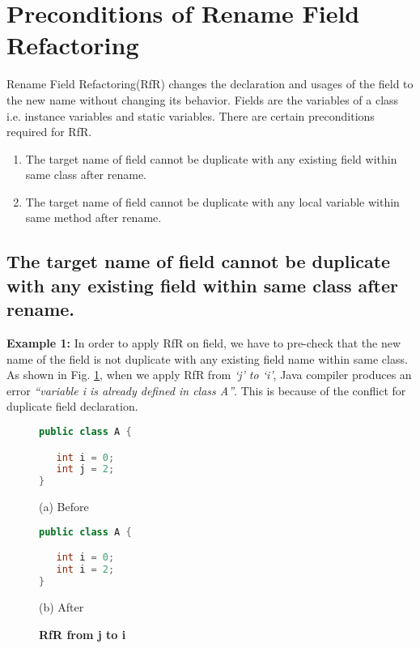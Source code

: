\section{\textbf{Preconditions of Rename Field Refactoring}}
Rename Field Refactoring(RfR) changes the declaration and usages of the field to the new name without changing its behavior.
Fields are the variables of a class i.e. instance variables and static variables.
There are certain preconditions required for RfR.

\begin{enumerate}
	\item The target name of field cannot be duplicate with any existing field within same class after rename.
	\item The target name of field cannot be duplicate with any local variable within same method after rename.
\end{enumerate}

\subsection{The target name of field cannot be duplicate with any existing field within same class after rename.}

\textbf{Example 1:} In order to apply RfR on field, we have to pre-check that the new name of the field is not duplicate with any existing field name within same class. As shown in Fig. \ref{figure:sameType}, when we apply RfR from \emph{`j' to `i'}, Java compiler produces an error \textit{``variable i is already defined in class A''}. This is because of the conflict for duplicate field declaration. 

\begin{figure}[th]
\centering
\begin{minipage}[t]{0.4\linewidth}
\begin{lstlisting}[language=java, basicstyle=\scriptsize\ttfamily,frame=single]
public class A {

   int i = 0;
   int j = 2;
}

\end{lstlisting}
\centering(a) Before
\end{minipage}
\hfill
\begin{minipage}[t]{0.4\linewidth}
\begin{lstlisting}[language=java, basicstyle=\scriptsize\ttfamily,frame=single]
public class A {

   int i = 0;
   int i = 2;
}
\end{lstlisting}
\centering(b) After
\end{minipage}
\caption{\textbf{RfR from j to i}}
\label{figure:sameType}
\end{figure}

